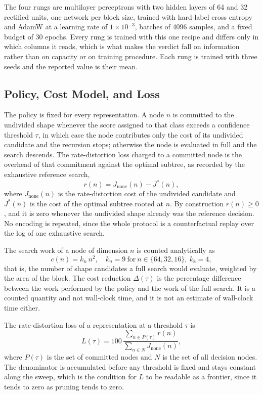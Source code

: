 \documentclass[conference]{IEEEtran}
\begin{document}
The four rungs are multilayer perceptrons with two hidden layers of 64 and 32
rectified units, one network per block size, trained with hard-label cross entropy
and AdamW \cite{adamw} at a learning rate of $1 \times 10^{-3}$, batches of 4096
samples, and a fixed budget of 30 epochs. Every rung is trained with this one
recipe and differs only in which columns it reads, which is what makes the verdict
fall on information rather than on capacity or on training procedure. Each rung is
trained with three seeds and the reported value is their mean.

\subsection{Policy, Cost Model, and Loss}

The policy is fixed for every representation. A node $n$ is committed to the
undivided shape whenever the score assigned to that class exceeds a confidence
threshold $\tau$, in which case the node contributes only the cost of its
undivided candidate and the recursion stops; otherwise the node is evaluated in
full and the search descends. The rate-distortion loss charged to a committed node
is the overhead of that commitment against the optimal subtree, as recorded by the
exhaustive reference search,
\begin{equation}
r(n) = J_{\mathrm{none}}(n) - J^{*}(n),
\label{eqn_regret}
\end{equation}
where $J_{\mathrm{none}}(n)$ is the rate-distortion cost of the undivided
candidate and $J^{*}(n)$ is the cost of the optimal subtree rooted at $n$. By
construction $r(n) \geq 0$, and it is zero whenever the undivided shape already
was the reference decision. No encoding is repeated, since the whole protocol is a
counterfactual replay over the log of one exhaustive search.

The search work of a node of dimension $n$ is counted analytically as
\begin{equation}
c(n) = k_{n}\,n^{2}, \quad k_{n} = 9 \ \mathrm{for} \ n \in \{64,32,16\},
\ k_{8} = 4,
\label{eqn_cost}
\end{equation}
that is, the number of shape candidates a full search would evaluate, weighted by
the area of the block. The cost reduction $\Delta(\tau)$ is the percentage
difference between the work performed by the policy and the work of the full
search. It is a counted quantity and not wall-clock time, and it is not an
estimate of wall-clock time either.

The rate-distortion loss of a representation at a threshold $\tau$ is
\begin{equation}
L(\tau) = 100 \, \frac{\sum_{n \in P(\tau)} r(n)}{\sum_{n \in N}
J_{\mathrm{none}}(n)},
\label{eqn_loss}
\end{equation}
where $P(\tau)$ is the set of committed nodes and $N$ is the set of all decision
nodes. The denominator is accumulated before any threshold is fixed and stays
constant along the sweep, which is the condition for $L$ to be readable as a
frontier, since it tends to zero as pruning tends to zero.
\end{document}
